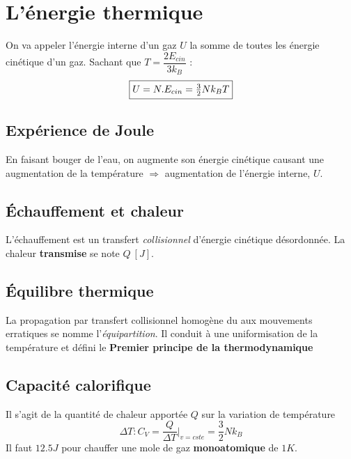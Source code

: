\documentclass	[11pt, a4paper, openany]{book}
\begin{document}
\section{L'énergie thermique}
On va appeler l'énergie interne d'un gaz $U$ la somme de toutes les énergie cinétique d'un gaz. Sachant que $T = \dfrac{2E_{cin}}{3k_B}$ :
\begin{equation}
	\fbox{$ U = N.E_{cin} = \frac{3}{2}Nk_BT$}
\end{equation}


\subsection{Expérience de Joule}
En faisant bouger de l'eau, on augmente son énergie cinétique causant une augmentation de la température $\Rightarrow$ augmentation de l'énergie interne, $U$.

\subsection{Échauffement et chaleur}
L'échauffement est un transfert \textit{collisionnel} d'énergie cinétique désordonnée. La chaleur \textbf{transmise} se note $Q\ [J]$.

\subsection{Équilibre thermique}
La propagation par transfert collisionnel homogène du aux mouvements erratiques se nomme l'\textit{équipartition}. Il conduit à une uniformisation de la température et défini le \textbf{Premier principe de la thermodynamique}
\begin{center}
\end{center}

\subsection{Capacité calorifique}
Il s'agit de la quantité de chaleur apportée $Q$ sur la variation de température 
\begin{equation}
	\Delta T : C_V = \dfrac{Q}{\Delta T}|_{v=cste} = \frac{3}{2}Nk_B
\end{equation}
Il faut $12.5J$ pour chauffer une mole de gaz \textbf{monoatomique} de $1K$.
\end{document}
